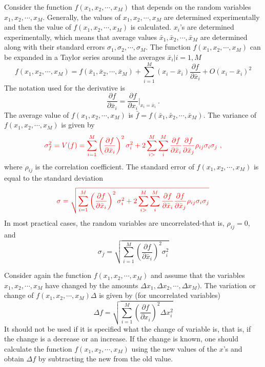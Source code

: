 \documentclass[12pt,a4paper]{article}
\begin{document}
Consider the function $f(x_1, x_2, \cdots, x_M)$ that depends on the random variables $x_1, x_2, \cdots, x_M$. Generally, the values of $x_1, x_2, \cdots, x_M$ are determined experimentally and then the value of $f(x_1, x_2, \cdots, x_M)$ is calculated. $x_i$'s are determined experimentally, which means that average values $\bar{x}_1, \bar{x}_2, \cdots, \bar{x}_M$ are determined along with their standard errors $\sigma_1, \sigma_2, \cdots, \sigma_M$. The function $f(x_1, x_2, \cdots, x_M)$ can be expanded in a Taylor series around the averages $\bar{x}_i|i = 1, M$
\begin{equation*}
f(x_1, x_2, \cdots, x_M) = f(\bar{x}_1, \bar{x}_2, \cdots, \bar{x}_M) + \sum_{i=1}^M (x_i -\bar{x}_i) \dfrac{\partial f}{\partial \bar{x}_i} +O(x_i -\bar{x}_i)^2
\end{equation*}
The notation used for the derivative is
\begin{equation*}
\dfrac{\partial f}{\partial \bar{x}_i} = \dfrac{\partial f}{\partial x_i} \Big|_{x_i = \bar{x}_i} ~.
\end{equation*}
The average value of $f(x_1, x_2, \cdots, x_M)$ is $\bar{f} = f(\bar{x}_1, \bar{x}_2, \cdots, \bar{x}_M)$. The variance of $f(x_1, x_2, \cdots, x_M)$ is given by
\begin{equation}
\color{red} \sigma^2_f = V(f) = \sum_{i=1}^M \left( \dfrac{\partial f}{\partial \bar{x}_i} \right)^2 \sigma_i^2 + 2\sum_{i> }^M \sum_i^M \dfrac{\partial f}{\partial \bar{x}_i} \dfrac{\partial f}{\partial \bar{x}_j} \rho_{ij} \sigma_i \sigma_j ~,
\end{equation}
where $\rho_{ij}$ is the correlation coefficient. The standard error of $f(x_1, x_2, \cdots, x_M)$ is equal to the standard deviation
\begin{equation}
\color{red} \sigma = \sqrt{\sum_{i=1}^M \left( \dfrac{\partial f}{\partial \bar{x}_i} \right)^2 \sigma_i^2 + 2\sum_{i> }^M \sum_i^M \dfrac{\partial f}{\partial \bar{x}_i} \dfrac{\partial f}{\partial \bar{x}_j} \rho_{ij} \sigma_i \sigma_j }
\end{equation}
In most practical cases, the random variables are uncorrelated-that is, $\rho_{ij} = 0$, and
\begin{equation}
\sigma_{\bar{f}} = \sqrt{\sum_{i=1}^M \left( \dfrac{\partial f}{\partial \bar{x}_i} \right)^2 \sigma_i^2 }
\end{equation}

Consider again the function $f(x_1, x_2, \cdots, x_M)$ and assume that the variables $x_1, x_2, \cdots, x_M$ have changed by the amounts $\Delta x_1, \Delta x_2, \cdots, \Delta x_M)$. The variation or change of $f(x_1, x_2, \cdots, x_M)\Delta$ is given by (for uncorrelated variables)
\begin{equation}
\Delta f = \sqrt{\sum_{i=1}^M \left( \dfrac{\partial f}{\partial x_i}  \right)^2 \Delta x_i^2}
\end{equation}
It should not be used if it is specified what the change of variable is, that is, if the change is a decrease or an increase. If the change is known, one should calculate the function $f(x_1, x_2, \cdots, x_M)$ using the new values of the $x$'s and obtain $\Delta f$ by subtracting the new from the old value.
\end{document}
